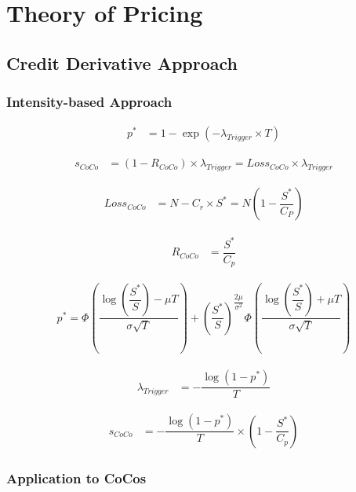 \chapter{Theory of Pricing}

\section{Credit Derivative Approach}

\subsection{Intensity-based Approach}

\begin{align}
    p^* &= 1 - \exp\left(- \lambda_{Trigger} \times T\right)
\end{align}

\begin{align}
    s_{CoCo} &= \left(1 - R_{CoCo}\right) \times \lambda_{Trigger} = {Loss}_{CoCo} \times \lambda_{Trigger}
\end{align}

\begin{align}
    {Loss}_{CoCo} &= N - C_r \times S^* = N \left(1 - \dfrac{S^*}{C_P} \right)
\end{align}

\begin{align}
    R_{CoCo} &= \dfrac{S^*}{C_p}
\end{align}

\begin{align}
    p^* = \Phi\left( \dfrac{\log \left(\dfrac{S^*}{S}\right) - \mu T}{\sigma \sqrt{T}}\right) + \left(\dfrac{S^*}{S}\right)^{\dfrac{2 \mu}{\sigma^2}} \Phi\left( \dfrac{\log \left(\dfrac{S^*}{S}\right) + \mu T}{\sigma \sqrt{T}}\right)
\end{align}

\begin{align}
\lambda_{Trigger} &= - \dfrac{\log \left(1 - p^* \right)}{T}
\end{align}

\begin{align}
s_{CoCo} &= -\dfrac{\log \left(1 - p^*\right)}{T} \times \left( 1 - \dfrac{S^*}{C_p} \right)
\end{align}

\subsection{Application to CoCos}

